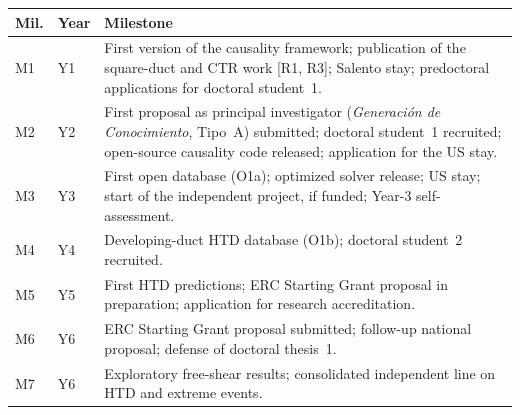 \documentclass[11pt]{article}
\begin{document}
\begin{center}\small
\begin{tabularx}{\textwidth}{@{}p{0.8cm}p{1.35cm}X@{}}
\toprule
\textbf{Mil.} & \textbf{Year} & \textbf{Milestone} \\
\midrule
M1 & Y1 & First version of the causality framework; publication of the square-duct and CTR work [R1, R3]; Salento stay; predoctoral applications for doctoral student~1. \\
M2 & Y2 & First proposal as principal investigator (\emph{Generaci\'on de Conocimiento}, Tipo~A) submitted; doctoral student~1 recruited; open-source causality code released; application for the US stay. \\
M3 & Y3 & First open database (O1a); optimized solver release; US stay; start of the independent project, if funded; Year-3 self-assessment. \\
M4 & Y4 & Developing-duct HTD database (O1b); doctoral student~2 recruited. \\
M5 & Y5 & First HTD predictions; ERC Starting Grant proposal in preparation; application for research accreditation. \\
M6 & Y6 & ERC Starting Grant proposal submitted; follow-up national proposal; defense of doctoral thesis~1. \\
M7 & Y6 & Exploratory free-shear results; consolidated independent line on HTD and extreme events. \\
\bottomrule
\end{tabularx}
\end{center}
\end{document}
